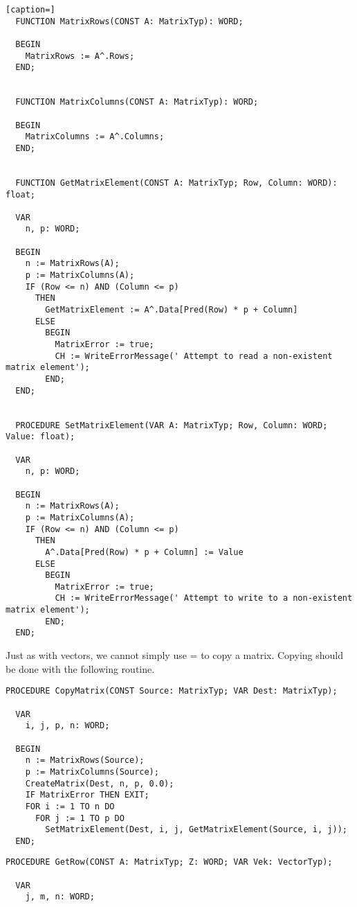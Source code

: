 \begin{refsection}
\begin{lstlisting}[caption=]
  FUNCTION MatrixRows(CONST A: MatrixTyp): WORD;

  BEGIN
    MatrixRows := A^.Rows;
  END;


  FUNCTION MatrixColumns(CONST A: MatrixTyp): WORD;

  BEGIN
    MatrixColumns := A^.Columns;
  END;


  FUNCTION GetMatrixElement(CONST A: MatrixTyp; Row, Column: WORD): float;

  VAR
    n, p: WORD;

  BEGIN
    n := MatrixRows(A);
    p := MatrixColumns(A);
    IF (Row <= n) AND (Column <= p)
      THEN
        GetMatrixElement := A^.Data[Pred(Row) * p + Column]
      ELSE
        BEGIN
          MatrixError := true;
          CH := WriteErrorMessage(' Attempt to read a non-existent matrix element');
        END;
  END;


  PROCEDURE SetMatrixElement(VAR A: MatrixTyp; Row, Column: WORD; Value: float);

  VAR
    n, p: WORD;

  BEGIN
    n := MatrixRows(A);
    p := MatrixColumns(A);
    IF (Row <= n) AND (Column <= p)
      THEN
        A^.Data[Pred(Row) * p + Column] := Value
      ELSE
        BEGIN
          MatrixError := true;
          CH := WriteErrorMessage(' Attempt to write to a non-existent matrix element');
        END;
  END;
\end{lstlisting}

Just as with vectors, we cannot simply use  =  to copy a matrix. Copying should be done with the following routine.

\begin{lstlisting}[caption=copy a matrix]
  PROCEDURE CopyMatrix(CONST Source: MatrixTyp; VAR Dest: MatrixTyp);

  VAR
    i, j, p, n: WORD;

  BEGIN
    n := MatrixRows(Source);
    p := MatrixColumns(Source);
    CreateMatrix(Dest, n, p, 0.0);
    IF MatrixError THEN EXIT;
    FOR i := 1 TO n DO
      FOR j := 1 TO p DO
        SetMatrixElement(Dest, i, j, GetMatrixElement(Source, i, j));
  END;
\end{lstlisting}


\begin{lstlisting}[caption=Row operations]
  PROCEDURE GetRow(CONST A: MatrixTyp; Z: WORD; VAR Vek: VectorTyp);

  VAR
    j, m, n: WORD;


\end{lstlisting}
\end{refsection}
